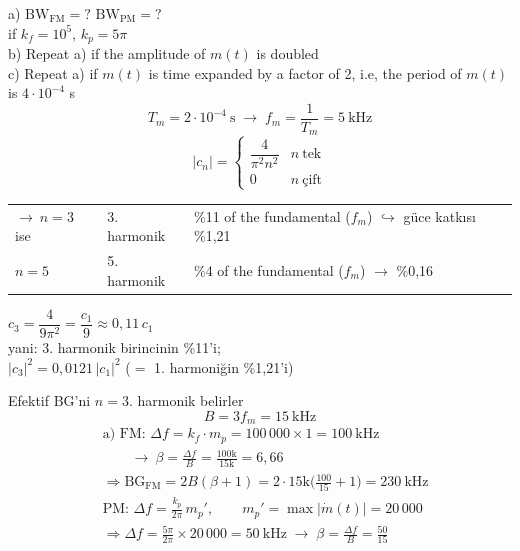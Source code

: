 \documentclass[11pt,a4paper]{article}
\begin{document}
a) $\mathrm{BW}_{\mathrm{FM}}=?$ \quad $\mathrm{BW}_{\mathrm{PM}}=?$\\
if $k_f=10^5$, $k_p=5\pi$\\
b) Repeat a) if the amplitude of $m(t)$ is doubled\\
c) Repeat a) if $m(t)$ is time expanded by a factor of 2, i.e, the period of $m(t)$ is $4\cdot10^{-4}$ s
\[ T_m=2\cdot10^{-4}\ \mathrm{s}\;\to\;f_m=\frac{1}{T_m}=5\ \mathrm{kHz} \]
\[ |c_n|=\begin{cases}\dfrac{4}{\pi^2n^2}&n\ \text{tek}\\[1ex] 0&n\ \text{çift}\end{cases} \]
\begin{tabular}{@{}l l l@{}}
$\to\ n=3$ ise & 3. harmonik & \%11 of the fundamental ($f_m$) $\hookrightarrow$ güce katkısı \%1,21\\
$n=5$ & 5. harmonik & \%4 of the fundamental ($f_m$) $\to$ \%0,16
\end{tabular}

$c_3=\dfrac{4}{9\pi^2}=\dfrac{c_1}{9}\approx0{,}11\,c_1$\\
yani: 3. harmonik birincinin \%11'i;\\
$|c_3|^2=0{,}0121\,|c_1|^2$ ($=$ 1. harmoniğin \%1,21'i)

Efektif BG'ni $n=3$. harmonik belirler
\[ B=3f_m=15\ \mathrm{kHz} \]
\begin{align*}
&\text{a) FM: }\Delta f=k_f\cdot m_p=100\,000\times1=100\ \mathrm{kHz}\\
&\qquad\to\ \beta=\frac{\Delta f}{B}=\frac{100\mathrm{k}}{15\mathrm{k}}=6{,}66\\
&\Rightarrow\mathrm{BG}_{\mathrm{FM}}=2B(\beta+1)=2\cdot15\mathrm{k}\Big(\frac{100}{15}+1\Big)=230\ \mathrm{kHz}\\
&\text{PM: }\Delta f=\frac{k_p}{2\pi}\,m_p',\qquad m_p'=\max|\dot m(t)|=20\,000\\
&\Rightarrow\Delta f=\frac{5\pi}{2\pi}\times20\,000=50\ \mathrm{kHz}\;\to\;\beta=\frac{\Delta f}{B}=\frac{50}{15}
\end{align*}
\end{document}
